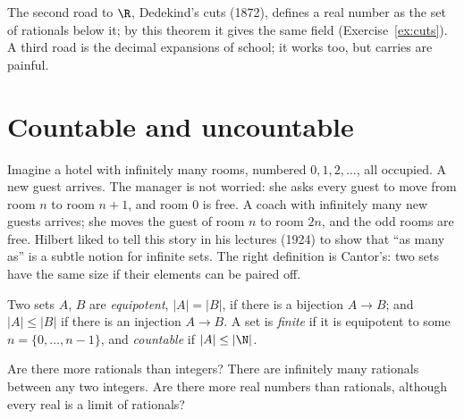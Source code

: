 The second road to $\R$, Dedekind's cuts (1872), defines a real number as the set of rationals below it; by this
theorem it gives the same field (Exercise~\ref{ex:cuts}). A third road is the decimal expansions of school; it works
too, but carries are painful.

\section{Countable and uncountable}

Imagine a hotel with infinitely many rooms, numbered $0,1,2,\ldots$, all occupied. A new guest arrives. The manager is not
worried: she asks every guest to move from room $n$ to room $n+1$, and room $0$ is free. A coach with infinitely many new
guests arrives; she moves the guest of room $n$ to room $2n$, and the odd rooms are free. Hilbert liked to tell this story
in his lectures (1924) to show that ``as many as'' is a subtle notion for infinite sets. The right definition is
Cantor's: two sets have the same size if their elements can be paired off.

\begin{definition}
Two sets $A$, $B$ are \emph{equipotent}, $|A|=|B|$, if there is a bijection $A\to B$; and $|A|\le|B|$ if there is an injection $A\to B$. A set
is \emph{finite} if it is equipotent to some $n=\{0,\dots,n-1\}$, and \emph{countable} if $|A|\le|\N|$.
\end{definition}

\begin{think}
Are there more rationals than integers? There are infinitely many rationals between any two integers. Are there
more real numbers than rationals, although every real is a limit of rationals?
\end{think}

